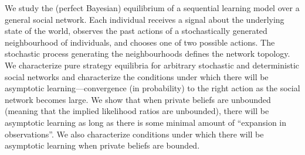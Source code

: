 We study the (perfect Bayesian) equilibrium of a sequential learning model over a general social network. Each individual receives a signal about the underlying state of the world, observes the past actions of a stochastically generated neighbourhood of individuals, and chooses one of two possible actions. The stochastic process generating the neighbourhoods defines the network topology. We characterize pure strategy equilibria for arbitrary stochastic and deterministic social networks and characterize the conditions under which there will be asymptotic learning—convergence (in probability) to the right action as the social network becomes large. We show that when private beliefs are unbounded (meaning that the implied likelihood ratios are unbounded), there will be asymptotic learning as long as there is some minimal amount of “expansion in observations”. We also characterize conditions under which there will be asymptotic learning when private beliefs are bounded.
